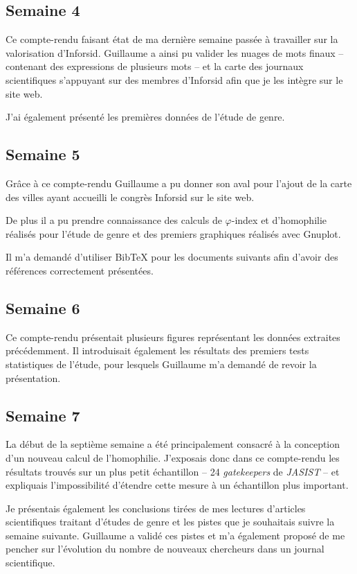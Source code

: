 	
	\subsection{Semaine 4}
		Ce compte-rendu faisant état de ma dernière semaine passée à travailler sur la valorisation d'Inforsid. Guillaume a ainsi pu valider les nuages de mots finaux -- contenant des expressions de plusieurs mots -- et la carte des journaux scientifiques s'appuyant sur des membres d'Inforsid afin que je les intègre sur le site web.
		
		J'ai également présenté les premières données de l'étude de genre.
	
	
	\subsection{Semaine 5}
		Grâce à ce compte-rendu Guillaume a pu donner son aval pour l'ajout de la carte des villes ayant accueilli le congrès Inforsid sur le site web.
		
		De plus il a pu prendre connaissance des calculs de $\varphi$-index et d'homophilie réalisés pour l'étude de genre et des premiers graphiques réalisés avec Gnuplot.
		
		Il m'a demandé d'utiliser BibTeX pour les documents suivants afin d'avoir des références correctement présentées.
	
	
	\subsection{Semaine 6}
		Ce compte-rendu présentait plusieurs figures représentant les données extraites précédemment. Il introduisait également les résultats des premiers tests statistiques de l'étude, pour lesquels Guillaume m'a demandé de revoir la présentation.
	
	
	\subsection{Semaine 7}
		La début de la septième semaine a été principalement consacré à la conception d'un nouveau calcul de l'homophilie. J'exposais donc dans ce compte-rendu les résultats trouvés sur un plus petit échantillon -- 24 \textit{gatekeepers} de \textit{JASIST} -- et expliquais l'impossibilité d'étendre cette mesure à un échantillon plus important.
		
		Je présentais également les conclusions tirées de mes lectures d'articles scientifiques traitant d'études de genre et les pistes que je souhaitais suivre la semaine suivante. Guillaume a validé ces pistes et m'a également proposé de me pencher sur l'évolution du nombre de nouveaux chercheurs dans un journal scientifique.
	
